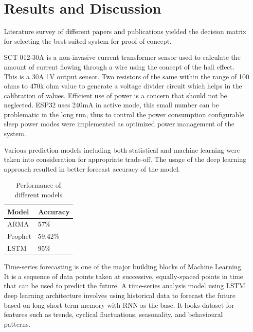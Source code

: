 \documentclass[journal]{IEEEtran}
\begin{document}
\section{Results and Discussion}
Literature survey of different papers and publications yielded the decision matrix for selecting the best-suited system for proof of concept. \par
SCT 012-30A is a non-invasive current transformer sensor used to calculate the amount of current flowing through a wire using the concept of the hall effect. This is a 30A 1V output sensor. Two resistors of the same within the range of 100 ohms to 470k ohm value to generate a voltage divider circuit which helps in the calibration of values. Efficient use of power is a concern that should not be neglected. ESP32 uses 240mA in active mode, this small number can be problematic in the long run, thus to control the power consumption configurable sleep power modes were implemented as optimized power management of the system.\par
Various prediction models including both statistical and machine learning were taken into consideration for appropriate trade-off. The usage of the deep learning approach resulted in better forecast accuracy of the model.
\newline 
  \begin{table}[!ht] %
  \centering
  \label{table:Exps}
  \begin{tabular}{ll}
   Model &  Accuracy \\ \hline
   ARMA &    57\% \\
   Prophet &   59.42\% \\
   LSTM &   95\% \\
 \end{tabular}
 \caption{Performance of different models}
 \end{table}
\newline
Time-series forecasting is one of the major building blocks of Machine Learning. It is a sequence of data points taken at successive, equally-spaced points in time that can be used to predict the future. A time-series analysis model using LSTM deep learning architecture involves using historical data to forecast the future based on long short term memory with RNN as the base. It looks dataset for features such as trends, cyclical fluctuations, seasonality, and behavioural patterns.
\end{document}
